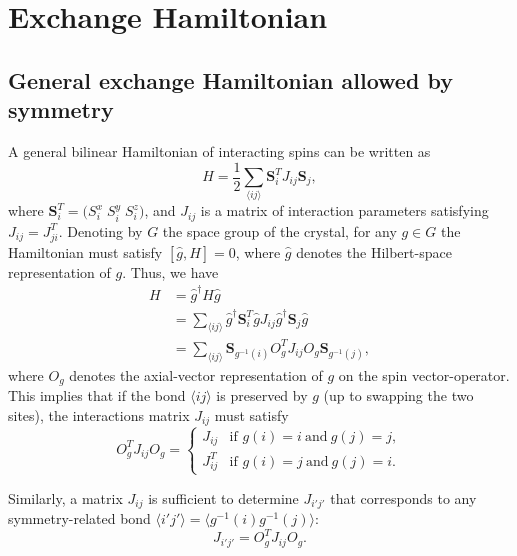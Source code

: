 \documentclass[12pt, a4paper]{article}
\newcommand{\mat}[1]{\bm{\mathit{#1}}}
\begin{document}
\tableofcontents
\section{Exchange Hamiltonian}
\subsection{General exchange Hamiltonian allowed by symmetry}
A general bilinear Hamiltonian of interacting spins can be written as
\begin{equation}
  H=\frac{1}{2}\sum_{\langle ij\rangle}\bm{S}_i^T \mat{J}_{ij}\bm{S}_j,
\end{equation}
where $\bm{S}_i^T=\bigl(S_i^x\;S_i^y\;S_i^z\bigr)$, and $\mat{J}_{ij}$ is a matrix of interaction parameters satisfying $\mat{J}_{ij}=\mat{J}_{ji}^T$. Denoting by $G$ the space group of the crystal, for any $g\in G$ the Hamiltonian must satisfy $[\hat{g},H]=0$, where $\hat{g}$ denotes the Hilbert-space representation of $g$. Thus, we have
\begin{align}
  H &= \hat{g}^{\dagger}H\hat{g}\\
   &= \sum_{\langle ij\rangle}\hat{g}^{\dagger}\bm{S}_i^T\hat{g} \mat{J}_{ij}\hat{g}^{\dagger}\bm{S}_j\hat{g}\\
   &= \sum_{\langle ij\rangle}\bm{S}_{g^{-1}(i)} \mat{O}_g^T \mat{J}_{ij}\mat{O}_g\bm{S}_{g^{-1}(j)},
\end{align}
where $\mat{O}_g$ denotes the axial-vector representation of $g$ on the spin vector-operator. This implies that if the bond $\langle ij\rangle$ is preserved by $g$ (up to swapping the two sites), the interactions matrix $\mat{J}_{ij}$ must satisfy
\begin{equation}
  \mat{O}_g^T \mat{J}_{ij}\mat{O}_g= \begin{cases}
    \mat{J}_{ij}&\textrm{if }g(i)=i~\textrm{and}~g(j)=j,\\
    \mat{J}_{ij}^T&\textrm{if }g(i)=j~\textrm{and}~g(j)=i.
  \end{cases}
\end{equation}

Similarly, a matrix $\mat{J}_{ij}$ is sufficient to determine $\mat{J}_{i'j'}$ that corresponds to any symmetry-related bond $\langle i'j'\rangle=\langle g^{-1}(i)g^{-1}(j)\rangle$:
\begin{equation}
  \mat{J}_{i'j'}=\mat{O}_g^T \mat{J}_{ij}\mat{O}_g.
\end{equation}
\end{document}
